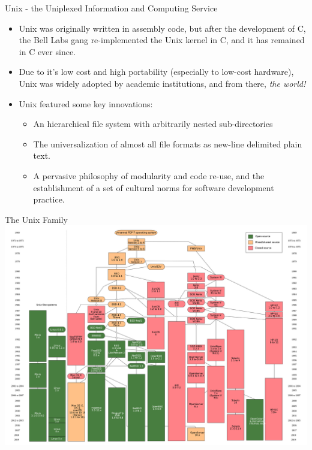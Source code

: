 \documentclass[11pt]{beamer}
\begin{document}
\begin{frame}{Unix - the Uniplexed Information and Computing Service}
\begin{itemize}
\item Unix was originally written in assembly code, but after the development of C, the Bell Labs gang re-implemented the Unix kernel in C, and it has remained in C ever since.  
\item Due to it's low cost and high portability (especially to low-cost hardware), Unix was widely adopted by academic institutions, and from there, \emph{the world!}
\item Unix featured some key innovations: 
    \begin{itemize}
        \item An hierarchical file system with arbitrarily nested sub-directories
        \item The universalization of almost all file formats as new-line delimited plain text.  
        \item A pervasive philosophy of modularity and code re-use, and the establishment of a set of cultural norms for software development practice.   
    \end{itemize}
\end{itemize}
\end{frame}

\begin{frame}{The Unix Family}
\center
\includegraphics[scale=0.1]{unixfamily.png}
\end{frame}
\end{document}
